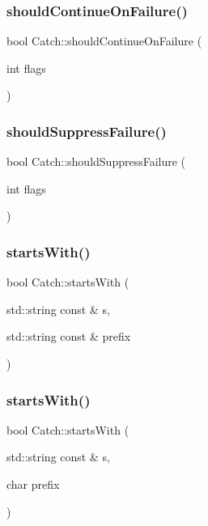 \subsubsection{\texorpdfstring{should\+Continue\+On\+Failure()}{shouldContinueOnFailure()}}
{\footnotesize\ttfamily bool Catch\+::should\+Continue\+On\+Failure (\begin{DoxyParamCaption}\item[{int}]{flags }\end{DoxyParamCaption})}

\mbox{\label{namespace_catch_ab91eb13081203d634fe48d3d2ab386d7}} 
\subsubsection{\texorpdfstring{should\+Suppress\+Failure()}{shouldSuppressFailure()}}
{\footnotesize\ttfamily bool Catch\+::should\+Suppress\+Failure (\begin{DoxyParamCaption}\item[{int}]{flags }\end{DoxyParamCaption})}

\mbox{\label{namespace_catch_a695f62327be0676e046291eeaae15110}} 
\subsubsection{\texorpdfstring{starts\+With()}{startsWith()}\hspace{0.1cm}{\footnotesize\ttfamily [1/2]}}
{\footnotesize\ttfamily bool Catch\+::starts\+With (\begin{DoxyParamCaption}\item[{std\+::string const \&}]{s,  }\item[{std\+::string const \&}]{prefix }\end{DoxyParamCaption})}

\mbox{\label{namespace_catch_acad23751846ac23d0f379e34f5adebb1}} 
\subsubsection{\texorpdfstring{starts\+With()}{startsWith()}\hspace{0.1cm}{\footnotesize\ttfamily [2/2]}}
{\footnotesize\ttfamily bool Catch\+::starts\+With (\begin{DoxyParamCaption}\item[{std\+::string const \&}]{s,  }\item[{char}]{prefix }\end{DoxyParamCaption})}

